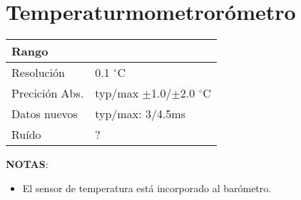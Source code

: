 \documentclass[spanish,12pt,a4paper,titlepage]{report}
\begin{document}
\section{Temperaturmometrorómetro}
\label{sec:temp}

\begin{table}[H]
\begin{center}
\begin{tabular}{|p{3cm}|p{6.5cm}|}
\hline
Rango & \\
\hline
Resolución &  0.1 $^\circ$C\\
\hline
Precición Abs. & typ/max $\pm$1.0/$\pm$2.0 $^\circ$C\\
\hline
Datos nuevos &  typ/max: 3/4.5ms\\
\hline
Ruído & ? \\
\hline
\end{tabular}
\label{tab:temp}
\end{center}
\end{table}

\textbf{NOTAS}:
\begin{itemize}
\item El sensor de temperatura está incorporado al barómetro.
\end{itemize}
\end{document}

